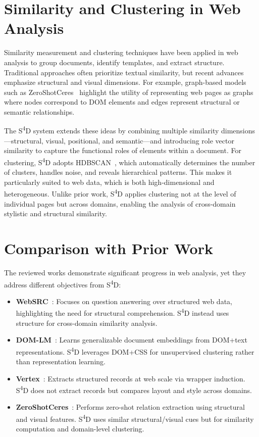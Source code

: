 \section{Similarity and Clustering in Web Analysis}
\label{sec:similarity-clustering}

Similarity measurement and clustering techniques have been applied in web analysis to group documents, identify templates, and extract structure. Traditional approaches often prioritize textual similarity, but recent advances emphasize structural and visual dimensions. For example, graph-based models such as ZeroShotCeres~\cite{lockard2020zeroshotceres} highlight the utility of representing web pages as graphs where nodes correspond to DOM elements and edges represent structural or semantic relationships.

The S\textsuperscript{4}D system extends these ideas by combining multiple similarity dimensions---structural, visual, positional, and semantic---and introducing role vector similarity to capture the functional roles of elements within a document. For clustering, S\textsuperscript{4}D adopts HDBSCAN~\cite{mcinnes2017hdbscan}, which automatically determines the number of clusters, handles noise, and reveals hierarchical patterns. This makes it particularly suited to web data, which is both high-dimensional and heterogeneous. Unlike prior work, S\textsuperscript{4}D applies clustering not at the level of individual pages but across domains, enabling the analysis of cross-domain stylistic and structural similarity.

\section{Comparison with Prior Work}
\label{sec:comparison}

The reviewed works demonstrate significant progress in web analysis, yet they address different objectives from S\textsuperscript{4}D:

\begin{itemize}
    \item \textbf{WebSRC}~\cite{chen2021websrc}: Focuses on question answering over structured web data, highlighting the need for structural comprehension. S\textsuperscript{4}D instead uses structure for cross-domain similarity analysis.
    \item \textbf{DOM-LM}~\cite{deng2022domlm}: Learns generalizable document embeddings from DOM+text representations. S\textsuperscript{4}D leverages DOM+CSS for unsupervised clustering rather than representation learning.
    \item \textbf{Vertex}~\cite{gulhane2011vertex}: Extracts structured records at web scale via wrapper induction. S\textsuperscript{4}D does not extract records but compares layout and style across domains.
    \item \textbf{ZeroShotCeres}~\cite{lockard2020zeroshotceres}: Performs zero-shot relation extraction using structural and visual features. S\textsuperscript{4}D uses similar structural/visual cues but for similarity computation and domain-level clustering.
\end{itemize}

